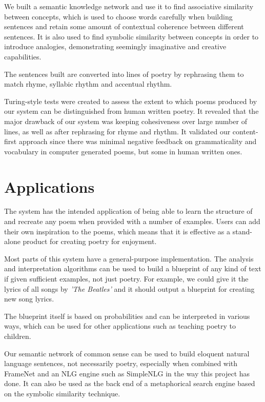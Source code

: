 We built a semantic knowledge network and use it to find associative similarity between concepts, which is used to choose words carefully when building sentences and retain some amount of contextual coherence between different sentences. It is also used to find symbolic similarity between concepts in order to introduce analogies, demonstrating seemingly imaginative and creative capabilities.

The sentences built are converted into lines of poetry by rephrasing them to match rhyme, syllabic rhythm and accentual rhythm.

Turing-style tests were created to assess the extent to which poems produced by our system can be distinguished from human written poetry. It revealed that the major drawback of our system was keeping cohesiveness over large number of lines, as well as after rephrasing for rhyme and rhythm. It validated our content-first approach since there was minimal negative feedback on grammaticality and vocabulary in computer generated poems, but some in human written ones.


\section{Applications}

The system has the intended application of being able to learn the structure of and recreate any poem when provided with a number of examples. Users can add their own inspiration to the poems, which means that it is effective as a stand-alone product for creating poetry for enjoyment.

Most parts of this system have a general-purpose implementation. The analysis and interpretation algorithms can be used to build a blueprint of any kind of text if given sufficient examples, not just poetry. For example, we could give it the lyrics of all songs by \textit{'The Beatles'} and it should output a blueprint for creating new song lyrics.

The blueprint itself is based on probabilities and can be interpreted in various ways, which can be used for other applications such as teaching poetry to children.

Our semantic network of common sense can be used to build eloquent natural language sentences, not necessarily poetry, especially when combined with FrameNet and an NLG engine such as SimpleNLG in the way this project has done. It can also be used as the back end of a metaphorical search engine based on the symbolic similarity technique.

